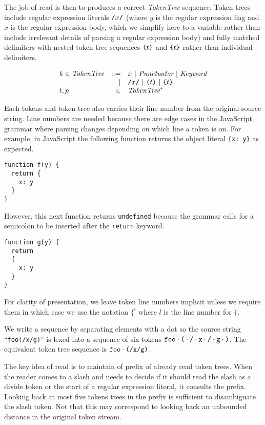 \documentclass[preprint,10pt]{sigplanconf}
\begin{document}
The job of read is then to produces a correct \textit{TokenTree} sequence. Token trees include regular expression literals $\texttt{/}x\texttt{/}$ (where $y$ is the regular expression flag and $x$ is the regular expression body, which we simplify here to a variable rather than include irrelevant details of parsing a regular expression body) and fully matched delimiters with nested token tree sequences $\texttt{(}t\texttt{)}$ and $\texttt{\{}t\texttt{\}}$ rather than individual delimiters.

\[
\begin{array}{lrl}
  k \in \textit{TokenTree} &::=& x ~|~ \textit{Punctuator} ~|~ \textit{Keyword}
  \\
  &|& \texttt{/}x\texttt{/} ~|~ \texttt{(}t\texttt{)} ~|~ \texttt{\{}t\texttt{\}}
  \\
  t,p &\in& \textit{TokenTree}^{*}
\end{array}
\]

Each tokens and token tree also carries their line number from the original source string. Line numbers are needed because there are edge cases in the JavaScript grammar where parsing changes depending on which line a token is on. For example,
in JavaScript the following function returns the object literal \verb!{x: y}! as expected. 
\begin{lstlisting}
function f(y) {
  return {
    x: y
  }
}
\end{lstlisting}
However, this next function returns \verb!undefined! because the grammar calls for a semicolon to be inserted after the \verb!return! keyword.
\begin{lstlisting}
function g(y) {
  return 
  {
    x: y
  }
}
\end{lstlisting}
For clarity of presentation, we leave token line numbers implicit unless we require them in which case we use the notation $\texttt{\{}^l$ where $l$ is the line number for $\texttt{\{}$.

We write a sequence by separating elements with a dot so
the source string ``\texttt{foo(/x/g)}'' 
is lexed into a sequence
of six tokens \( \texttt{foo}\cdot \texttt{(} \cdot \texttt{/} \cdot \texttt{x}
\cdot \texttt{/} \cdot \texttt{g} \cdot \texttt{)} \). The equivalent token tree sequence is
\(
\texttt{foo} \cdot \texttt{(}\texttt{/} \texttt{x} \texttt{/} \texttt{g}\texttt{)}
\).


The key idea of read is to maintain of prefix of already read token
trees. When the reader comes to a slash and needs to decide if it
should read the slash as a divide token or the start of a regular
expression literal, it consults the prefix. Looking back at most five
tokens trees in the prefix is sufficient to disambiguate the slash
token. Not that this may correspond to looking back an unbounded
distance in the original token stream.
\end{document}
